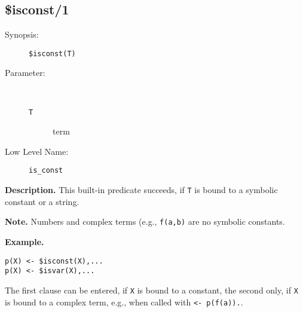 %
%
%
\subsection{\$isconst/1}

\begin{description}
\item[Synopsis:]
	{\tt \$isconst(T)}
\item[Parameter:]\ \\[-0.5cm]
	\begin{description}
	\item[{\tt T}]
	term
	\end{description}
\item[Low Level Name:]
	{\tt is\_const}
\end{description}

\vspace*{0.5cm}
\noindent
{\bf Description.}
This built-in predicate succeeds, if {\tt T} is
bound to a symbolic constant or a string.

\vspace*{0.5cm}
\noindent
{\bf Note.}
Numbers and complex terms (e.g., {\tt f(a,b)} are no symbolic constants.

\vspace*{0.5cm}
\noindent
{\bf Example.}
\begin{verbatim}
p(X) <- $isconst(X),...
p(X) <- $isvar(X),...
\end{verbatim}
The first clause can be entered, if {\tt X} is bound to a constant,
the second only, if {\tt X} is bound to a complex term, e.g., when
called with {\tt <- p(f(a)).}.


